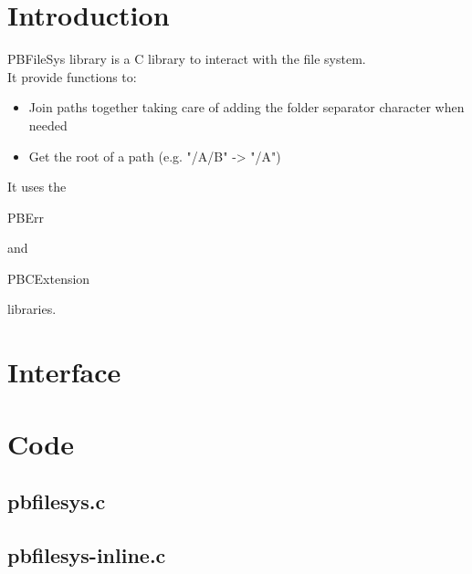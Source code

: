 \section*{Introduction}

PBFileSys library is a C library to interact with the file system.\\

It provide functions to:
\begin{itemize}
\item Join paths together taking care of adding the folder separator character when needed
\item Get the root of a path (e.g. "/A/B" -> "/A")
\end{itemize}

It uses the \begin{ttfamily}PBErr\end{ttfamily} and \begin{ttfamily}PBCExtension\end{ttfamily} libraries.\\

\section{Interface}

\begin{scriptsize}
\begin{ttfamily}

\end{ttfamily}
\end{scriptsize}

\section{Code}

\subsection{pbfilesys.c}

\begin{scriptsize}
\begin{ttfamily}

\end{ttfamily}
\end{scriptsize}

\subsection{pbfilesys-inline.c}

